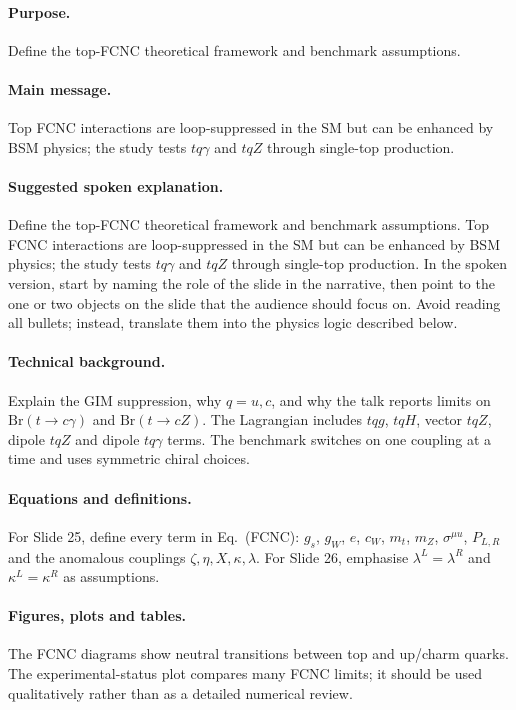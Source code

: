 \documentclass[11pt,a4paper]{report}
\newcommand{\br}{\mathrm{Br}}
\begin{document}
\paragraph{Purpose.}
Define the top-FCNC theoretical framework and benchmark assumptions.

\paragraph{Main message.}
Top FCNC interactions are loop-suppressed in the SM but can be enhanced by BSM physics; the study tests $tq\gamma$ and $tqZ$ through single-top production.

\paragraph{Suggested spoken explanation.}
Define the top-FCNC theoretical framework and benchmark assumptions. Top FCNC interactions are loop-suppressed in the SM but can be enhanced by BSM physics; the study tests $tq\gamma$ and $tqZ$ through single-top production. In the spoken version, start by naming the role of the slide in the narrative, then point to the one or two objects on the slide that the audience should focus on.  Avoid reading all bullets; instead, translate them into the physics logic described below.

\paragraph{Technical background.}
Explain the GIM suppression, why $q=u,c$, and why the talk reports limits on $\br(t\to c\gamma)$ and $\br(t\to cZ)$.  The Lagrangian includes $tqg$, $tqH$, vector $tqZ$, dipole $tqZ$ and dipole $tq\gamma$ terms.  The benchmark switches on one coupling at a time and uses symmetric chiral choices.

\paragraph{Equations and definitions.}
For Slide 25, define every term in Eq.~(FCNC): $g_s$, $g_W$, $e$, $c_W$, $m_t$, $m_Z$, $\sigma^{\mu
u}$, $P_{L,R}$ and the anomalous couplings $\zeta,\eta,X,\kappa,\lambda$.  For Slide 26, emphasise $\lambda^L=\lambda^R$ and $\kappa^L=\kappa^R$ as assumptions.

\paragraph{Figures, plots and tables.}
The FCNC diagrams show neutral transitions between top and up/charm quarks.  The experimental-status plot compares many FCNC limits; it should be used qualitatively rather than as a detailed numerical review.
\end{document}
